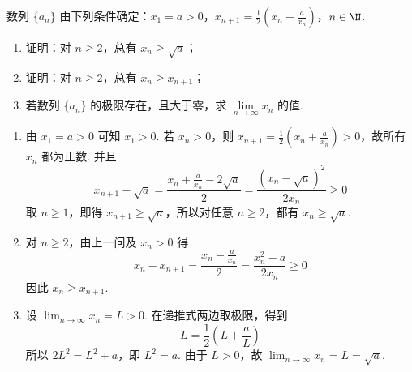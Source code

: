 \begin{problem}
数列 \(\{a_n\}\) 由下列条件确定：\(x_1=a>0\)，\(x_{n+1}=\frac12\left(x_n+\frac{a}{x_n}\right)\)，\(n\in\N\).

\begin{enumerate}
\item 证明：对 \(n\ge 2\)，总有 \(x_n\ge \sqrt{a}\)；
\item 证明：对 \(n\ge 2\)，总有 \(x_n\ge x_{n+1}\)；
\item 若数列 \(\{a_n\}\) 的极限存在，且大于零，求 \(\lim\limits_{n\to\infty}x_n\) 的值.
\end{enumerate}

\begin{solution}
\begin{enumerate}
\item 由 \(x_1=a>0\) 可知 \(x_1>0\). 若 \(x_n>0\)，则 \(x_{n+1}=\frac12\left(x_n+\frac{a}{x_n}\right)>0\)，故所有 \(x_n\) 都为正数. 并且
\[
x_{n+1}-\sqrt{a}=\frac{x_n+\frac{a}{x_n}-2\sqrt{a}}{2}=\frac{(x_n-\sqrt{a})^{2}}{2x_n}\geqslant0
\]
取 \(n\geqslant1\)，即得 \(x_{n+1}\geqslant\sqrt{a}\)，所以对任意 \(n\geqslant2\)，都有 \(x_n\geqslant\sqrt{a}\).
\item 对 \(n\geqslant2\)，由上一问及 \(x_n>0\) 得
\[
x_n-x_{n+1}=\frac{x_n-\frac{a}{x_n}}{2}=\frac{x_n^{2}-a}{2x_n}\geqslant0
\]
因此 \(x_n\geqslant x_{n+1}\).
\item 设 \(\displaystyle\lim_{n\to\infty}x_n=L>0\). 在递推式两边取极限，得到
\[
L=\frac12\left(L+\frac{a}{L}\right)
\]
所以 \(2L^{2}=L^{2}+a\)，即 \(L^{2}=a\). 由于 \(L>0\)，故 \(\displaystyle\lim_{n\to\infty}x_n=L=\sqrt{a}\).
\end{enumerate}
\end{solution}
\end{problem}

